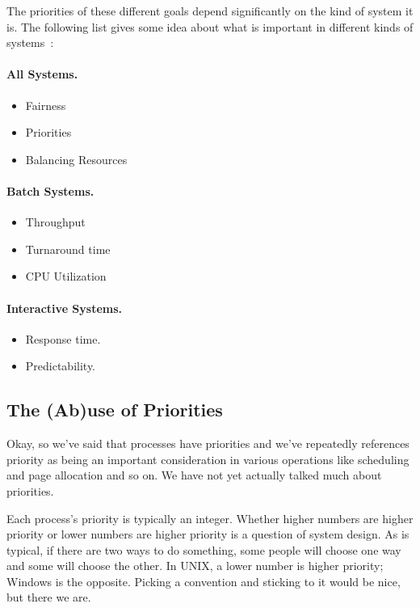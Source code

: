 The priorities of these different goals depend significantly on the kind of system it is. The following list gives some idea about what is important in different kinds of systems~\cite{mos}:

\paragraph{All Systems.}
\begin{itemize}
	\item Fairness
	\item Priorities
	\item Balancing Resources
\end{itemize}

\paragraph{Batch Systems.}
\begin{itemize}
	\item Throughput
	\item Turnaround time
	\item CPU Utilization
\end{itemize}

\paragraph{Interactive Systems.}
\begin{itemize}
	\item Response time.
	\item Predictability.
\end{itemize}

\subsection*{The (Ab)use of Priorities}

Okay, so we've said that processes have priorities and we've repeatedly references priority as being an important consideration in various operations like scheduling and page allocation and so on. We have not yet actually talked much about priorities.

Each process's priority is typically an integer. Whether higher numbers are higher priority or lower numbers are higher priority is a question of system design. As is typical, if there are two ways to do something, some people will choose one way and some will choose the other. In UNIX, a lower number is higher priority; Windows is the opposite. Picking a convention and sticking to it would be nice, but there we are.

